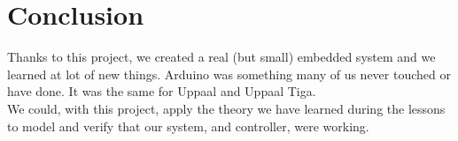 
\section{Conclusion}
Thanks to this project, we created a real (but small) embedded system and we learned at lot of new things. Arduino was something many of us never touched or have done. It was the same for Uppaal and Uppaal Tiga. \\
We could, with this project, apply the theory we have learned during the lessons to model and verify that our system, and controller, were working.
